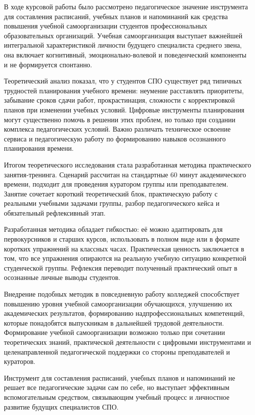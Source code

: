 \documentclass[14pt,a4paper]{article}
\begin{document}
В ходе курсовой работы было рассмотрено педагогическое значение инструмента для составления расписаний, учебных планов и напоминаний как средства повышения учебной самоорганизации студентов профессиональных образовательных организаций. Учебная самоорганизация выступает важнейшей интегральной характеристикой личности будущего специалиста среднего звена, она включает когнитивный, эмоционально‑волевой и поведенческий компоненты и не формируется спонтанно.

Теоретический анализ показал, что у студентов СПО существует ряд типичных трудностей планирования учебного времени: неумение расставлять приоритеты, забывание сроков сдачи работ, прокрастинация, сложности с корректировкой планов при изменении учебных условий. Цифровые инструменты планирования могут существенно помочь в решении этих проблем, но только при создании комплекса педагогических условий. Важно различать техническое освоение сервиса и педагогическую работу по формированию навыков осознанного планирования времени.

Итогом теоретического исследования стала разработанная методика практического занятия‑тренинга. Сценарий рассчитан на стандартные 60 минут академического времени, подходит для проведения куратором группы или преподавателем. Занятие сочетает короткий теоретический блок, практическую работу с реальными учебными задачами группы, разбор педагогического кейса и обязательный рефлексивный этап.

Разработанная методика обладает гибкостью: её можно адаптировать для первокурсников и старших курсов, использовать в полном виде или в формате коротких упражнений на классных часах. Практическая ценность заключается в том, что все упражнения опираются на реальную учебную ситуацию конкретной студенческой группы. Рефлексия переводит полученный практический опыт в осознанные личные выводы студентов.

Внедрение подобных методик в повседневную работу колледжей способствует повышению уровня учебной самоорганизации обучающихся, улучшению их академических результатов, формированию надпрофессиональных компетенций, которые понадобятся выпускникам в дальнейшей трудовой деятельности. Формирование учебной самоорганизации возможно только при сочетании теоретических знаний, практической деятельности с цифровыми инструментами и целенаправленной педагогической поддержки со стороны преподавателей и кураторов.

Инструмент для составления расписаний, учебных планов и напоминаний не решает все педагогические задачи сам по себе, но выступает эффективным вспомогательным средством, связывающим учебный процесс и личностное развитие будущих специалистов СПО.
\end{document}

